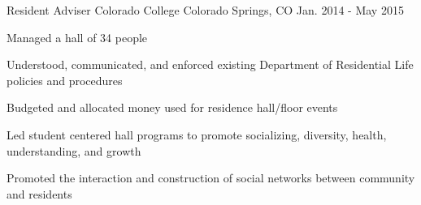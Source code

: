 \begin{cventries}
\vspace{-1.5em}
\cventry
{Resident Adviser} %
{Colorado College} %
{Colorado Springs, CO} %
{Jan. 2014 - May 2015} %
{ %
\begin{cvitems}
\item{Managed a hall of 34 people}
\item{Understood, communicated, and enforced existing Department of Residential Life policies and procedures}
\item{Budgeted and allocated money used for residence hall/floor events}
\item{Led student centered hall programs to promote socializing, diversity, health, understanding, and growth}
\item{Promoted the interaction and construction of social networks between community and residents}
\end{cvitems} 
}






\end{cventries}
